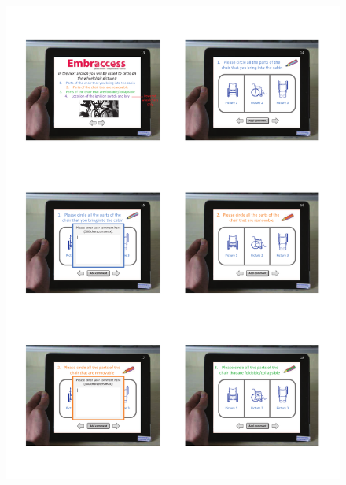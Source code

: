 \begin{figure}[h]
  \centering
     \includegraphics[scale=0.75]{images/App_UI_3.pdf}
  \label{fig:App_UI_3}
\end{figure}

